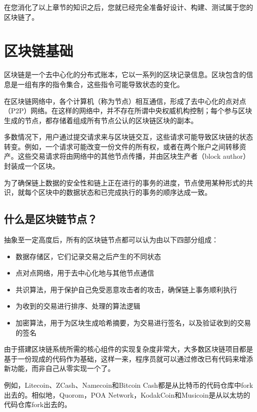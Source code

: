 在您消化了以上章节的知识之后，您就已经完全准备好设计、构建、测试属于您的区块链了。

\section{区块链基础}

区块链是一个去中心化的分布式账本，它以一系列的区块记录信息。区块包含的信息是一组有序的指令集合，这些指令可能导致状态的变化。

在区块链网络中，各个计算机（称为节点）相互通信，形成了去中心化的点对点（P2P）网络。在这样的网络中，并不存在所谓中央权威机构控制；每个参与区块生成的节点，都存储着组成所有节点公认的区块链区块的副本。

多数情况下，用户通过提交请求来与区块链交互，这些请求可能导致区块链的状态转变。例如，一个请求可能改变一份文件的所有权，或者在两个账户之间转移资产。这些交易请求将由网络中的其他节点传播，并由区块生产者（block
author）封装成一个区块。

为了确保链上数据的安全性和链上正在进行的事务的进度，节点使用某种形式的共识，就每个区块中的数据状态和已完成执行的事务的顺序达成一致。

\hypertarget{ux4ec0ux4e48ux662fux533aux5757ux94feux8282ux70b9}{%
\subsection{什么是区块链节点？}\label{ux4ec0ux4e48ux662fux533aux5757ux94feux8282ux70b9}}

抽象至一定高度后，所有的区块链节点都可以认为由以下四部分组成：

\begin{itemize}
\item
  数据存储区，它们记录交易之后产生的不同状态
\item
  点对点网络，用于去中心化地与其他节点通信
\item
  共识算法，用于保护自己免受恶意攻击者的攻击，确保链上事务顺利执行
\item
  为收到的交易进行排序、处理的算法逻辑
\item
  加密算法，用于为区块生成哈希摘要，为交易进行签名，以及验证收到的交易的签名
\end{itemize}

由于搭建区块链系统所需的核心组件的实现复杂度非常大，大多数区块链项目都是基于一份现成的代码作为基础，这样一来，程序员就可以通过修改已有代码来增添新功能，而非自己从零实现一个了。

例如，Litecoin、ZCash、Namecoin和Bitcoin
Cash都是从比特币的代码仓库中fork出去的。相似地，Quorom，POA
Network，KodakCoin和Musicoin是从以太坊的代码仓库fork出去的。

